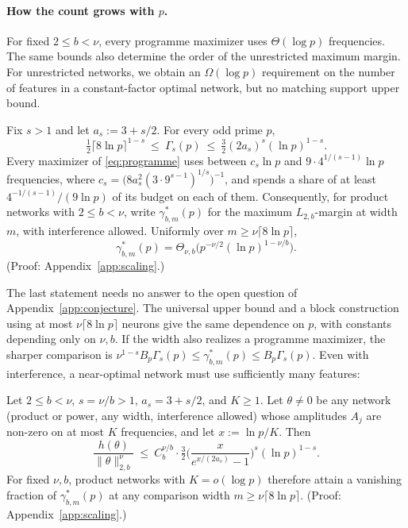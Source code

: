\paragraph{How the count grows with $p$.}
For fixed $2\le b<\nu$, every programme maximizer uses $\Theta(\log p)$ frequencies. The same bounds also determine the order of the unrestricted maximum margin. For unrestricted networks, we obtain an $\Omega(\log p)$ requirement on the number of features in a constant-factor optimal network, but no matching support upper bound.

\begin{theorem}\label{thm:scaling}
Fix $s>1$ and let $a_s:=3+s/2$. For every odd prime $p$,
\[
\tfrac12\lceil8\ln p\rceil^{1-s}\ \le\ \Gamma_s(p)\ \le\ \tfrac32(2a_s)^s(\ln p)^{1-s}.
\]
Every maximizer of \eqref{eq:programme} uses between $c_s\ln p$ and $9\cdot4^{1/(s-1)}\ln p$ frequencies, where $c_s=\big(8a_s^2(3\cdot9^{s-1})^{1/s}\big)^{-1}$, and spends a share of at least $4^{-1/(s-1)}/(9\ln p)$ of its budget on each of them. Consequently, for product networks with $2\le b<\nu$, write $\gamma^*_{b,m}(p)$ for the maximum $L_{2,b}$-margin at width $m$, with interference allowed. Uniformly over $m\ge\nu\lceil8\ln p\rceil$,
\[
\gamma^*_{b,m}(p)=\Theta_{\nu,b}\big(p^{-\nu/2}(\ln p)^{1-\nu/b}\big).
\]
(Proof: Appendix~\ref{app:scaling}.)
\end{theorem}

The last statement needs no answer to the open question of Appendix~\ref{app:conjecture}. The universal upper bound and a block construction using at most $\nu\lceil8\ln p\rceil$ neurons give the same dependence on $p$, with constants depending only on $\nu,b$. If the width also realizes a programme maximizer, the sharper comparison is $\nu^{1-s}B_p\Gamma_s(p)\le\gamma^*_{b,m}(p)\le B_p\Gamma_s(p)$. Even with interference, a near-optimal network must use sufficiently many features:

\begin{corollary}\label{cor:few}
Let $2\le b<\nu$, $s=\nu/b>1$, $a_s=3+s/2$, and $K\ge1$. Let $\theta\neq0$ be any network (product or power, any width, interference allowed) whose amplitudes $A_j$ are non-zero on at most $K$ frequencies, and let $x:=\ln p/K$. Then
\[
\frac{h(\theta)}{\|\theta\|_{2,b}^\nu}\ \le\ C_b^{\nu/b}\cdot\tfrac32\Big(\frac{x}{e^{x/(2a_s)}-1}\Big)^{s}(\ln p)^{1-s}.
\]
For fixed $\nu,b$, product networks with $K=o(\log p)$ therefore attain a vanishing fraction of $\gamma^*_{b,m}(p)$ at any comparison width $m\ge\nu\lceil8\ln p\rceil$. (Proof: Appendix~\ref{app:scaling}.)
\end{corollary}

